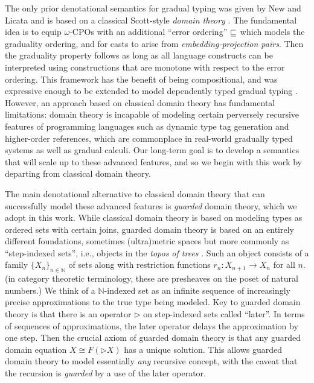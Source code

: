 The only prior denotational semantics for gradual typing was given by
New and Licata and is based on a classical Scott-style \emph{domain
theory} \cite{new-licata18}. The fundamental idea is to equip
$\omega$-CPOs with an additional ``error ordering'' $\sqsubseteq$ which
models the graduality ordering, and for casts to arise from
\emph{embedding-projection pairs}. Then the graduality property
follows as long as all language constructs can be interpreted using
constructions that are monotone with respect to the error ordering.
%
This framework has the benefit of being compositional, and was
expressive enough to be extended to model dependently typed gradual
typing \cite{gradualizing-cic}.
%
However, an approach based on classical domain theory has fundamental
limitations: domain theory is incapable of modeling certain perversely
recursive features of programming languages such as dynamic type tag
generation and higher-order references, which are commonplace in
real-world gradually typed systems as well as gradual calculi.
%
Our long-term goal is to develop a semantics that will scale up to these
advanced features, and so we begin with this work by departing from
classical domain theory.

The main denotational alternative to classical domain theory that can
successfully model these advanced features is \emph{guarded} domain
theory, which we adopt in this work. While classical domain theory is
based on modeling types as ordered sets with certain joins, guarded
domain theory is based on an entirely different foundations, sometimes
(ultra)metric spaces but more commonly as ``step-indexed sets'', i.e.,
objects in the \emph{topos of trees}
\cite{birkedal-mogelberg-schwinghammer-stovring2011}.  Such an object
consists of a family $\{X_n\}_{n \in \mathbb{N}}$ of sets along with
restriction functions $r_n : X_{n+1} \to X_n$ for all $n$.  (in
category theoretic terminology, these are presheaves on the poset of
natural numbers.)  We think of a $\mathbb{N}$-indexed set as an infinite
sequence of increasingly precise approximations to the true type being
modeled.
%
Key to guarded domain theory is that there is an operator
$\triangleright$ on step-indexed sets called ``later''. In terms of
sequences of approximations, the later operator delays the
approximation by one step. Then the crucial axiom of guarded domain
theory is that any guarded domain equation $X \cong F(\triangleright
X)$ has a unique solution. This allows guarded domain theory to model
essentially \emph{any} recursive concept, with the caveat that the
recursion is \emph{guarded} by a use of the later operator.


